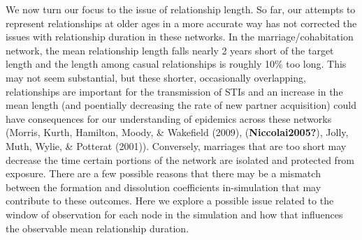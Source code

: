 \documentclass [11pt, proquest] {uwthesis}[2015/03/03]
\begin{document}
We now turn our focus to the issue of relationship length. So far, our attempts to represent relationships at older ages in a more accurate way has not corrected the issues with relationship duration in these networks. In the marriage/cohabitation network, the mean relationship length falls nearly 2 years short of the target length and the length among casual relationships is roughly 10\% too long. This may not seem substantial, but these shorter, occasionally overlapping, relationships are important for the transmission of STIs and an increase in the mean length (and poentially decreasing the rate of new partner acquisition) could have consequences for our understanding of epidemics across these networks (Morris, Kurth, Hamilton, Moody, \& Wakefield (2009), (\textbf{Niccolai2005?}), Jolly, Muth, Wylie, \& Potterat (2001)). Conversely, marriages that are too short may decrease the time certain portions of the network are isolated and protected from exposure. There are a few possible reasons that there may be a mismatch between the formation and dissolution coefficients in-simulation that may contribute to these outcomes. Here we explore a possible issue related to the window of observation for each node in the simulation and how that influences the observable mean relationship duration.
\end{document}

